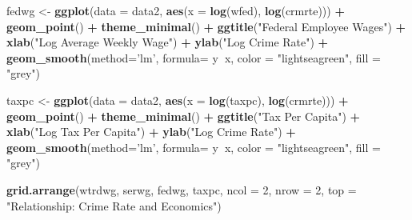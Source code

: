 \documentclass[]{article}
\newenvironment{Shaded}{\begin{snugshade}}{\end{snugshade}}
\newcommand{\DataTypeTok}[1]{\textcolor[rgb]{0.13,0.29,0.53}{#1}}
\newcommand{\DecValTok}[1]{\textcolor[rgb]{0.00,0.00,0.81}{#1}}
\newcommand{\KeywordTok}[1]{\textcolor[rgb]{0.13,0.29,0.53}{\textbf{#1}}}
\newcommand{\NormalTok}[1]{#1}
\newcommand{\OperatorTok}[1]{\textcolor[rgb]{0.81,0.36,0.00}{\textbf{#1}}}
\newcommand{\StringTok}[1]{\textcolor[rgb]{0.31,0.60,0.02}{#1}}
\begin{document}
\begin{Shaded}
\begin{Highlighting}[]
\NormalTok{fedwg <-}\StringTok{ }\KeywordTok{ggplot}\NormalTok{(}\DataTypeTok{data =}\NormalTok{ data2, }\KeywordTok{aes}\NormalTok{(}\DataTypeTok{x =} \KeywordTok{log}\NormalTok{(wfed), }\KeywordTok{log}\NormalTok{(crmrte))) }\OperatorTok{+}
\StringTok{  }\KeywordTok{geom_point}\NormalTok{() }\OperatorTok{+}
\StringTok{  }\KeywordTok{theme_minimal}\NormalTok{() }\OperatorTok{+}
\StringTok{  }\KeywordTok{ggtitle}\NormalTok{(}\StringTok{"Federal Employee Wages"}\NormalTok{) }\OperatorTok{+}\StringTok{ }
\StringTok{  }\KeywordTok{xlab}\NormalTok{(}\StringTok{"Log Average Weekly Wage"}\NormalTok{) }\OperatorTok{+}\StringTok{ }\KeywordTok{ylab}\NormalTok{(}\StringTok{"Log Crime Rate"}\NormalTok{) }\OperatorTok{+}
\StringTok{  }\KeywordTok{geom_smooth}\NormalTok{(}\DataTypeTok{method=}\StringTok{'lm'}\NormalTok{, }\DataTypeTok{formula=}\NormalTok{ y}\OperatorTok{~}\NormalTok{x, }\DataTypeTok{color =} \StringTok{"lightseagreen"}\NormalTok{, }\DataTypeTok{fill =} \StringTok{"grey"}\NormalTok{)}

\NormalTok{taxpc <-}\StringTok{ }\KeywordTok{ggplot}\NormalTok{(}\DataTypeTok{data =}\NormalTok{ data2, }\KeywordTok{aes}\NormalTok{(}\DataTypeTok{x =} \KeywordTok{log}\NormalTok{(taxpc), }\KeywordTok{log}\NormalTok{(crmrte))) }\OperatorTok{+}
\StringTok{  }\KeywordTok{geom_point}\NormalTok{() }\OperatorTok{+}
\StringTok{  }\KeywordTok{theme_minimal}\NormalTok{() }\OperatorTok{+}
\StringTok{  }\KeywordTok{ggtitle}\NormalTok{(}\StringTok{"Tax Per Capita"}\NormalTok{) }\OperatorTok{+}\StringTok{ }
\StringTok{  }\KeywordTok{xlab}\NormalTok{(}\StringTok{"Log Tax Per Capita"}\NormalTok{) }\OperatorTok{+}\StringTok{ }\KeywordTok{ylab}\NormalTok{(}\StringTok{"Log Crime Rate"}\NormalTok{) }\OperatorTok{+}
\StringTok{  }\KeywordTok{geom_smooth}\NormalTok{(}\DataTypeTok{method=}\StringTok{'lm'}\NormalTok{, }\DataTypeTok{formula=}\NormalTok{ y}\OperatorTok{~}\NormalTok{x, }\DataTypeTok{color =} \StringTok{"lightseagreen"}\NormalTok{, }\DataTypeTok{fill =} \StringTok{"grey"}\NormalTok{)}

\KeywordTok{grid.arrange}\NormalTok{(wtrdwg, serwg, fedwg, taxpc, }\DataTypeTok{ncol =} \DecValTok{2}\NormalTok{, }\DataTypeTok{nrow =} \DecValTok{2}\NormalTok{, }\DataTypeTok{top =} \StringTok{"Relationship: Crime Rate and Economics"}\NormalTok{)}
\end{Highlighting}
\end{Shaded}
\end{document}

